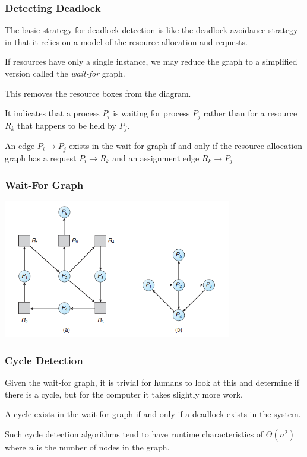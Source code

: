 \begin{frame}
\frametitle{Detecting Deadlock}

The basic strategy for deadlock detection is like the deadlock avoidance strategy in that it relies on a model of the resource allocation and requests. 

If resources have only a single instance, we may reduce the graph to a simplified version called the \textit{wait-for} graph. 

This removes the resource boxes from the diagram.

It indicates that a process $P_{i}$ is waiting for process $P_{j}$ rather than for a resource $R_{k}$ that happens to be held by $P_{j}$. 

An edge $P_{i} \rightarrow P_{j}$ exists in the wait-for graph if and only if the resource allocation graph has a request $P_{i} \rightarrow R_{k}$ and an assignment edge $R_{k} \rightarrow P_{j}$

\end{frame}

\begin{frame}
\frametitle{Wait-For Graph}

\begin{center}
\includegraphics[width=0.75\textwidth]{images/rag-waitfor.png}
\end{center}

\end{frame}

\begin{frame}
\frametitle{Cycle Detection}

Given the wait-for graph, it is trivial for humans to look at this and determine if there is a cycle, but for the computer it takes slightly more work. 

A cycle exists in the wait for graph if and only if a deadlock exists in the system. 

Such cycle detection algorithms tend to have runtime characteristics of $\Theta(n^{2})$ where $n$ is the number of nodes in the graph. 

\end{frame}

